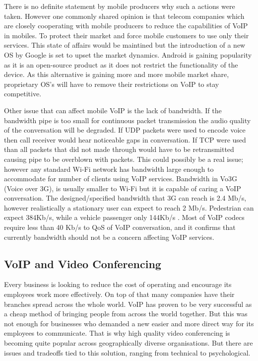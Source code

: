There is no definite statement by mobile producers why such a actions were taken. However one commonly shared opinion is that telecom companies which are closely cooperating with mobile producers to reduce the capabilities of VoIP in mobiles. To protect their market and force mobile customers to use only their services. This state of affairs would be maintined but the introduction of a new OS by Google is set to upset the market dynamics. Android is gaining popularity as it is an open-source product as it does not restrict the functionality of the device. As this alternative is gaining more and more mobile market share, proprietary OS's will have to remove their restrictions on VoIP to stay competitive.

Other issue that can affect mobile VoIP is the lack of bandwidth. If the bandwidth pipe is too small for continuous packet transmission the audio quality of the conversation will be degraded. If UDP packets were used to encode voice then call receiver would hear noticeable gaps in conversation. If TCP were used than all packets that did not made through would have to be retransmitted causing pipe to be overblown with packets. This could possibly be a real issue; however any standard Wi-Fi network has bandwidth large enough to accommodate for number of clients using VoIP services. Bandwidth in Vo3G (Voice over 3G), is usually smaller to Wi-Fi but it is capable of caring a VoIP conversation. The designed/specified bandwidth that 3G can reach is 2.4 Mb/s, however realistically a stationary user can expect to reach 2 Mb/s. Pedestrian can expect 384Kb/s, while a vehicle passenger only 144Kb/s \cite{website:3g_spec}. Most of VoIP codecs require less than 40 Kb/s to QoS of VoIP conversation\cite{website:voip_codecs}, and it confirms that currently bandwidth should not be a concern affecting VoIP services.

\subsection{VoIP and Video Conferencing}
Every business is looking to reduce the cost of operating and encourage its employees work more effectively. On top of that many companies have their branches spread across the whole world. VoIP has proven to be very successful as a cheap method of bringing people from across the world together. But this was not enough for businesses who demanded a new easier and more direct way for its employees to communicate. That is why high quality video conferencing is becoming quite popular across geographically diverse organisations. But there are issues and tradeoffs tied to this solution, ranging from technical to psychological\cite{website:vid_conf_voice_protocol_overview}.

